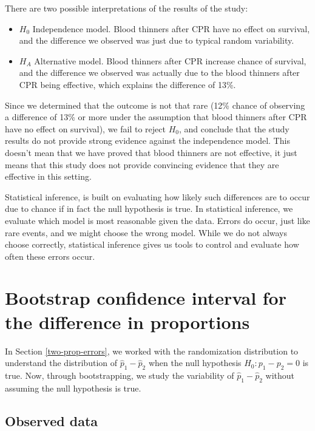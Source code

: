 \documentclass[
  10pt,
  openany]{book}
\providecommand{\tightlist}{%
  \setlength{\itemsep}{0pt}\setlength{\parskip}{0pt}}
\begin{document}
There are two possible interpretations of the results of the study:

\begin{itemize}
\tightlist
\item
  \(H_0\) Independence model. Blood thinners after CPR have no effect on survival, and the difference we observed was just due to typical random variability.
\item
  \(H_A\) Alternative model. Blood thinners after CPR increase chance of survival, and the difference we observed was actually due to the blood thinners after CPR being effective, which explains the difference of 13\%.
\end{itemize}

Since we determined that the outcome is not that rare (12\% chance of observing a difference of 13\% or more under the assumption that blood thinners after CPR have no effect on survival), we fail to reject \(H_0\), and conclude that the study results do not provide strong evidence against the independence model.
This doesn't mean that we have proved that blood thinners are not effective, it just means that this study does not provide convincing evidence that they are effective in this setting.

Statistical inference, is built on evaluating how likely such differences are to occur due to chance if in fact the null hypothesis is true.
In statistical inference, we evaluate which model is most reasonable given the data.
Errors do occur, just like rare events, and we might choose the wrong model.
While we do not always choose correctly, statistical inference gives us tools to control and evaluate how often these errors occur.

\hypertarget{two-prop-boot-ci}{%
\section{Bootstrap confidence interval for the difference in proportions}\label{two-prop-boot-ci}}


In Section \ref{two-prop-errors}, we worked with the randomization distribution to understand the distribution of \(\hat{p}_1 - \hat{p}_2\) when the null hypothesis \(H_0: p_1 - p_2 = 0\) is true.
Now, through bootstrapping, we study the variability of \(\hat{p}_1 - \hat{p}_2\) without assuming the null hypothesis is true.

\hypertarget{observed-data-9}{%
\subsection{Observed data}\label{observed-data-9}}
\end{document}
